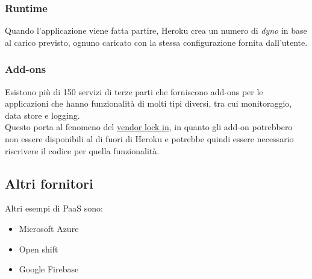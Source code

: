 \subsubsection{Runtime}
Quando l'applicazione viene fatta partire, Heroku crea un numero di \textit{dyno} in base al carico previsto, ognuno caricato con la stessa configurazione fornita dall'utente.
\subsubsection{Add-ons}
Esistono più di 150 servizi di terze parti che forniscono add-ons per le applicazioni che hanno funzionalità di molti tipi diversi, tra cui monitoraggio, data store e logging.\\
Questo porta al fenomeno del \hyperref[vendor_lockin]{vendor lock in}, in quanto gli add-on potrebbero non essere disponibili al di fuori di Heroku e potrebbe quindi essere necessario riscrivere il codice per quella funzionalità.

\subsection{Altri fornitori}
Altri esempi di PaaS sono:
\begin{itemize}
	\item Microsoft Azure
	\item Open shift
	\item Google Firebase
\end{itemize}